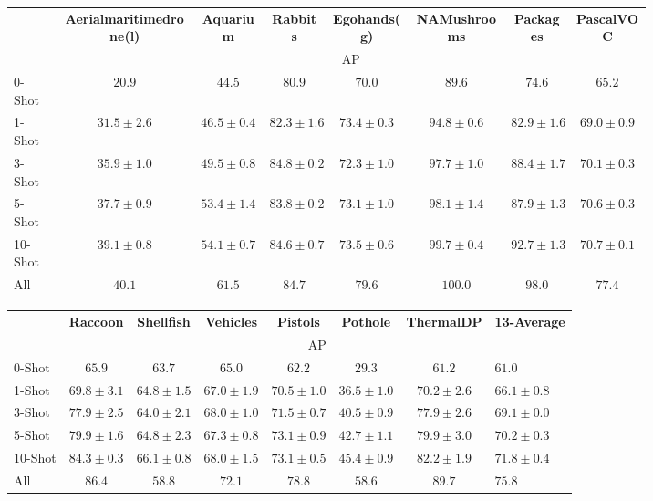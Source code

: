 \documentclass[]{fairmeta}
\newcommand{\myappendixtablesize}{8}
\newcommand{\myappendixtablebaselineskip}{9.5}
\begin{document}
\begin{figure}[htbp!]
		\begin{subfigure}{\textwidth}
			\centering
            \fontsize{\myappendixtablesize}{\myappendixtablebaselineskip}\selectfont
				\begin{tabular}{lccccccc}
					& \textbf{Aerialmaritimedrone(l)} & \textbf{Aquarium} & \textbf{Rabbits} & \textbf{Egohands(g)} & \textbf{NAMushrooms} & \textbf{Packages} & \textbf{PascalVOC} \\
					\cmidrule(lr){2-8}
					& \multicolumn{7}{c}{AP} \\
					\midrule
					0-Shot & $20.9$ & $44.5$ & $80.9$ & $70.0$ & $89.6$ & $74.6$ & $65.2$ \\
					1-Shot  & $31.5 \pm 2.6$ & $46.5 \pm 0.4$ & $82.3 \pm 1.6$ & $73.4 \pm 0.3$ & $94.8 \pm 0.6$ & $82.9 \pm 1.6$ & $69.0 \pm 0.9$ \\
					3-Shot  & $35.9 \pm 1.0$ & $49.5 \pm 0.8$ & $84.8 \pm 0.2$ & $72.3 \pm 1.0$ & $97.7 \pm 1.0$ & $88.4 \pm 1.7$ & $70.1 \pm 0.3$ \\
					5-Shot & $37.7 \pm 0.9$ & $53.4 \pm 1.4$ & $83.8 \pm 0.2$ & $73.1 \pm 1.0$ & $98.1 \pm 1.4$ & $87.9 \pm 1.3$ & $70.6 \pm 0.3$ \\
					10-Shot & $39.1 \pm 0.8$ & $54.1 \pm 0.7$ & $84.6 \pm 0.7$ & $73.5 \pm 0.6$ & $99.7 \pm 0.4$ & $92.7 \pm 1.3$ & $70.7 \pm 0.1$ \\
					All & $40.1$ & $61.5$ & $84.7$ & $79.6$ & $100.0$ & $98.0$ & $77.4$ \\
				\end{tabular}
			\vspace{0.3em}
			
            \fontsize{\myappendixtablesize}{\myappendixtablebaselineskip}\selectfont
				\begin{tabular}{lccccccl}
					& \textbf{Raccoon} & \textbf{Shellfish} & \textbf{Vehicles} & \textbf{Pistols} & \textbf{Pothole} & \textbf{ThermalDP} & \textbf{13-Average} \\
					\cmidrule(lr){2-8}
					& \multicolumn{7}{c}{AP} \\
					\midrule
					0-Shot & $65.9$ & $63.7$ & $65.0$ & $62.2$ & $29.3$ & $61.2$ & $61.0$ \\
					1-Shot & $69.8 \pm 3.1$ & $64.8 \pm 1.5$ & $67.0 \pm 1.9$ & $70.5 \pm 1.0$ & $36.5 \pm 1.0$ & $70.2 \pm 2.6$ & $66.1 \pm 0.8$ \\
					3-Shot & $77.9 \pm 2.5$ & $64.0 \pm 2.1$ & $68.0 \pm 1.0$ & $71.5 \pm 0.7$ & $40.5 \pm 0.9$ & $77.9 \pm 2.6$ & $69.1 \pm 0.0$  \\
					5-Shot & $79.9 \pm 1.6$ & $64.8 \pm 2.3$ & $67.3 \pm 0.8$ & $73.1 \pm 0.9$ & $42.7 \pm 1.1$ & $79.9 \pm 3.0$ & $70.2 \pm 0.3$ \\
					10-Shot & $84.3 \pm 0.3$ & $66.1 \pm 0.8$ & $68.0 \pm 1.5$ & $73.1 \pm 0.5$ & $45.4 \pm 0.9$ & $82.2 \pm 1.9$ & $71.8 \pm 0.4$ \\
					All & $86.4$ & $58.8$ & $72.1$ & $78.8$ & $58.6$ & $89.7$ & $75.8$ \\
				\end{tabular}
			

\end{subfigure}
\end{figure}
\end{document}
